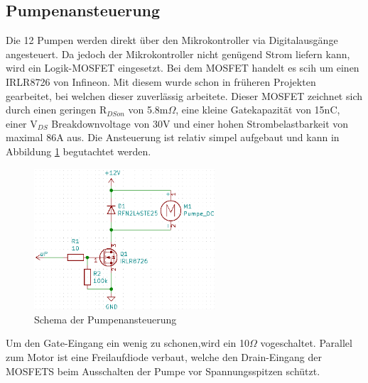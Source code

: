 \subsection{Pumpenansteuerung}
\label{subsec:Pumpenansteuerung}

Die 12 Pumpen werden direkt über den Mikrokontroller via Digitalausgänge angesteuert. Da jedoch der Mikrokontroller nicht genügend Strom liefern kann, wird ein Logik-MOSFET eingesetzt. Bei dem MOSFET handelt es scih um einen IRLR8726 von Infineon. Mit diesem wurde schon in früheren Projekten gearbeitet, bei welchen dieser zuverlässig arbeitete. Dieser MOSFET zeichnet sich durch einen geringen R$_{DSon}$ von 5.8m$\Omega$, eine kleine Gatekapazität von 15nC, einer V$_{DS}$ Breakdownvoltage von 30V und einer hohen Strombelastbarkeit von maximal 86A aus. Die Ansteuerung ist relativ simpel aufgebaut und kann in Abbildung \ref{fig:Pumpenansteuerung} begutachtet werden. 

\begin{figure}[h!]
\centering
\includegraphics[width=0.6\textwidth]{graphics/Pumpenansteuerung.png}
\caption{Schema der Pumpenansteuerung}
\label{fig:Pumpenansteuerung}
\end{figure} 

Um den Gate-Eingang ein wenig zu schonen,wird ein 10$\Omega$ vogeschaltet. Parallel zum Motor ist eine Freilaufdiode verbaut, welche den Drain-Eingang der MOSFETS beim Ausschalten der Pumpe vor Spannungsspitzen schützt. 